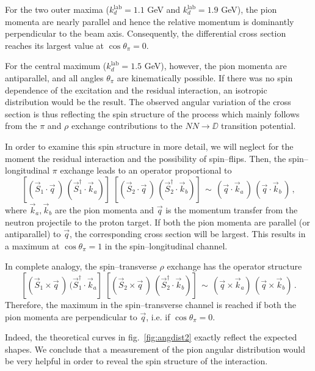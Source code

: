 For the two outer maxima ($k_d^{\text{lab}} = 1.1$ GeV and 
$k_d^{\text{lab}} = 1.9$ GeV), the pion momenta
are nearly parallel and hence the relative momentum is dominantly perpendicular
to the beam axis. Consequently, the differential cross section reaches 
its largest value at $\cos \theta_\pi = 0$.

For the central maximum  ($k^{\text{lab}}_d = 1.5$ GeV), however, the pion momenta are 
antiparallel, and all angles $\theta_\pi$ are kinematically possible. 
If there was no spin dependence of the excitation and the residual interaction,
an isotropic distribution would be the result. The observed angular variation
of the cross section is thus reflecting the spin structure of the process
which mainly follows from the $\pi$ and $\rho$ exchange contributions to 
the $NN \! \rightarrow \DD$ transition potential.

In order to examine this spin structure in more detail, we will neglect 
for the moment the residual interaction and the possibility of spin--flips.
Then, the spin--longitudinal $\pi$ exchange leads to an operator 
proportional to
\begin{equation}
  \left[ (\vec S_1 \cdot \vec q \,) \, (\vec S_1^\dagger \cdot \vec k_a) \right] \;
  \left[ (\vec S_2 \cdot \vec q \,) \, (\vec S_2^\dagger \cdot \vec k_b) \right] 
  \, \sim \, (\vec q \cdot \vec k_a \,) \, (\vec q \cdot \vec k_b \,) \, ,
\end{equation}
where $\vec k_a, \vec k_b$ are the pion momenta and $\vec q$ is the momentum
transfer from the neutron projectile to the proton target. If both the pion momenta
are parallel (or antiparallel) to $\vec q$, the corresponding cross section
will be largest. This results in a maximum at $\cos \theta_\pi = 1$ in the
spin--longitudinal channel.

In complete analogy, the spin--transverse $\rho$ exchange has the operator structure
\begin{equation}
  \left[ (\vec S_1 \times \vec q \,) \, (\vec S_1^\dagger \cdot \vec k_a \right] \;
  \left[ (\vec S_2 \times \vec q \,) \, (\vec S_2^\dagger \cdot \vec k_b) \right]
  \, \sim \, (\vec q \times \vec k_a) \, (\vec q \times \vec k_b) \, .
\end{equation}
Therefore, the maximum in the spin--transverse channel is reached if both the pion momenta
are perpendicular to $\vec q$, i.e. if $\cos \theta_\pi = 0$.

Indeed, the theoretical curves in fig.\ \ref{fig:angdist2} exactly reflect
the expected shapes. We conclude that a measurement of the pion angular 
distribution would be very helpful in order to reveal the spin structure 
of the interaction.


